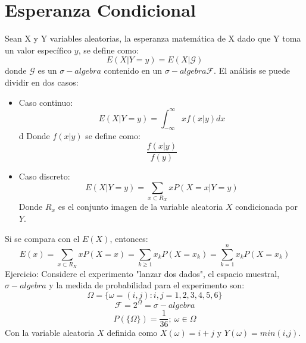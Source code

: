 \documentclass[11pt,fleqn]{book} %
\numberwithin{equation}{section} %
\numberwithin{figure}{section} %
\numberwithin{table}{section} %
\begin{document}
\section{Esperanza Condicional}
Sean X y Y variables aleatorias, la esperanza matemática de X dado que Y toma un valor específico $y$, se define como: $$E(X|Y=y)=E(X|\mathcal{G})$$
donde $\mathcal{G}$ es un $\sigma-algebra$ contenido en un $\sigma-algebra \mathcal{F}$. El análisis se puede dividir en dos casos:
\begin{itemize}
\item Caso continuo: $$E(X|Y=y)=\int_{-\infty}^{\infty} xf(x|y) dx$$ d
Donde $f(x|y)$ se define como: $$\frac{f(x|y)}{f(y)}$$
\item Caso discreto: $$E(X|Y=y)=\sum_{x\subset R_X}xP(X=x|Y=y)$$ 
Donde $R_{x}$ es el conjunto imagen de la variable aleatoria $X$ condicionada por $Y$.
\end{itemize}
Si se compara con el $E(X)$, entonces:
$$E(x)=\sum_{x\subset R_X}xP(X=x)=\sum_{k\ge 1}x_kP(X=x_k)=\sum_{k=1}^nx_kP(X=x_k)$$
Ejercicio: Considere el experimento "lanzar dos dados", el espacio muestral, $\sigma-algebra$ y la medida de probabilidad para el experimento son: 
$$\Omega=\lbrace \omega =(i,j): i,j=1,2,3,4,5,6\rbrace$$ $$\mathcal{F}=2^{\Omega}=\sigma-algebra$$ $$P(\lbrace\Omega\rbrace)=\frac{1}{36}; \ \omega\in\Omega$$ 
Con la variable aleatoria $X$ definida como $X(\omega)= i+j$  y $Y(\omega)=\textit{min}(\textit{i,j})$. 
\end{document}
